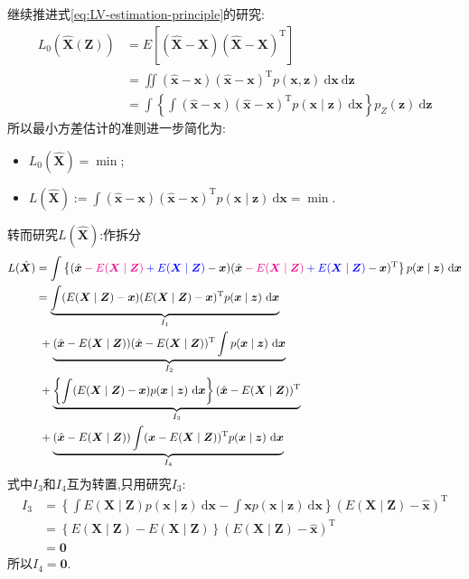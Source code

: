 \documentclass[cn,10pt,citestyle=gb7714-2015,bibstyle=gb7714-2015]{elegantbook}
\newcommand{\md}{\ \mathrm{d}}
\newcommand{\mT}{\mathrm{T}}
\begin{document}
继续推进式\eqref{eq:LV-estimation-principle}的研究:
\begin{align*}
  L_0(\hat{\bm{X}}(\bm{Z}))&=E[(\hat{\bm{X}}-\bm{X})(\hat{\bm{X}}-\bm{X})^\mT]\\
  &=\iint (\hat{\bm{x}}-\bm{x})(\hat{\bm{x}}-\bm{x})^\mT p(\bm{x},\bm{z})\md\bm{x}\!\md\bm{z}\\
  &=\int\left\{\int (\hat{\bm{x}}-\bm{x})(\hat{\bm{x}}-\bm{x})^\mT p(\bm{x}\mid\bm{z})\md\bm{x}\right\}p_Z(\bm{z})\md\bm{z}
\end{align*}
所以最小方差估计的准则进一步简化为:
\begin{itemize}
  \item $L_0(\hat{\bm{X}})=\min$;
  \item $\displaystyle L(\hat{\bm{X}}):=\int (\hat{\bm{x}}-\bm{x})(\hat{\bm{x}}-\bm{x})^\mT p(\bm{x}\mid\bm{z})\md\bm{x}=\min$.
\end{itemize}
转而研究$L(\hat{\bm{X}})$:作拆分
\begin{align*}
  L(\hat{\bm{X}})&=\int\left\{(\hat{\bm{x}}\textcolor{magenta}{{}-E(\bm{X}\mid\bm{Z})}\textcolor{blue}{{}+E(\bm{X}\mid\bm{Z})}-\bm{x})(\hat{\bm{x}}\textcolor{magenta}{{}-E(\bm{X}\mid\bm{Z})}\textcolor{blue}{{}+E(\bm{X}\mid\bm{Z})}-\bm{x})^\mT\right\}p(\bm{x}\mid\bm{z})\md\bm{x}\\
  &=\underbrace{\int(E(\bm{X}\mid\bm{Z})-\bm{x})(E(\bm{X}\mid\bm{Z})-\bm{x})^\mT p(\bm{x}\mid\bm{z})\md\bm{x}}_{I_1}\\
  &\ {}+\underbrace{(\hat{\bm{x}}-E(\bm{X}\mid\bm{Z}))(\hat{\bm{x}}-E(\bm{X}\mid\bm{Z}))^\mT\int p(\bm{x}\mid\bm{z})\md\bm{x}}_{I_2}\\
  &\ {}+\underbrace{\left\{\int(E(\bm{X}\mid\bm{Z})-\bm{x})p(\bm{x}\mid\bm{z})\md\bm{x}\right\}(\hat{\bm{x}}-E(\bm{X}\mid\bm{Z}))^\mT}_{I_3}\\
  &\ {}+\underbrace{(\hat{\bm{x}}-E(\bm{X}\mid\bm{Z}))\int(\bm{x}-E(\bm{X}\mid\bm{Z}))^\mT p(\bm{x}\mid\bm{z})\md\bm{x}}_{I_4}
\end{align*}
式中$I_3$和$I_4$互为转置,只用研究$I_3$:
\begin{align*}
  I_3&=\left\{\int E(\bm{X}\mid\bm{Z})p(\bm{x}\mid\bm{z})\md\bm{x}-\int\bm{x}p(\bm{x}\mid\bm{z})\md\bm{x}\right\}(E(\bm{X}\mid\bm{Z})-\hat{\bm{x}})^\mT\\
  &=\left\{E(\bm{X}\mid\bm{Z})-E(\bm{X}\mid\bm{Z})\right\}(E(\bm{X}\mid\bm{Z})-\hat{\bm{x}})^\mT\\
  &=\bm{0}
\end{align*}
所以$I_4=\bm{0}$.
\end{document}
